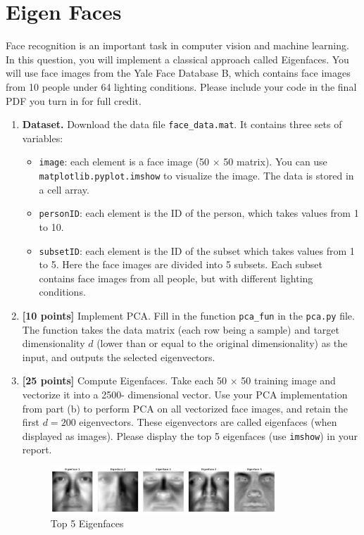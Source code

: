 \documentclass[a3paper,12pt]{extarticle} %
\begin{document}
\newpage
\section{Eigen Faces}
Face recognition is an important task in computer vision and machine learning. In this question, you will
implement a classical approach called Eigenfaces. You will use face images from the Yale Face Database
B, which contains face images from 10 people under 64 lighting conditions. Please include your code in
the final PDF you turn in for full credit.

\begin{enumerate}
    \item \textbf{Dataset.} Download the data file \texttt{face\_data.mat}. It contains three sets of variables:
    \begin{itemize}
        \item \texttt{image}: each element is a face image (50 × 50 matrix). You can use \texttt{matplotlib.pyplot.imshow}
        to visualize the image. The data is stored in a cell array.
        \item \texttt{personID}: each element is the ID of the person, which takes values from 1 to 10.
        \item \texttt{subsetID}: each element is the ID of the subset which takes values from 1 to 5. Here the face
        images are divided into 5 subsets. Each subset contains face images from all people, but with
        different lighting conditions.
    \end{itemize}
    
    \item \textbf{[10 points]} Implement PCA. Fill in the function \texttt{pca\_fun} in the \texttt{pca.py} file. The function takes the
    data matrix (each row being a sample) and target dimensionality $d$ (lower than or equal to the original
    dimensionality) as the input, and outputs the selected eigenvectors.
    
    \item \textbf{[25 points]} Compute Eigenfaces. Take each 50 × 50 training image and vectorize it into a 2500-
    dimensional vector. Use your PCA implementation from part (b) to perform PCA on all vectorized
    face images, and retain the first $d = 200$ eigenvectors. These eigenvectors are called eigenfaces (when
    displayed as images). Please display the top 5 eigenfaces (use \texttt{imshow}) in your report.
    \begin{figure}[H]
    \centering
    \includegraphics[width=0.8\textwidth]{top_5_eigenfaces.png}
    \caption{Top 5 Eigenfaces}
    \label{fig:eigenfaces}
    \end{figure}
\end{enumerate}
\end{document}
